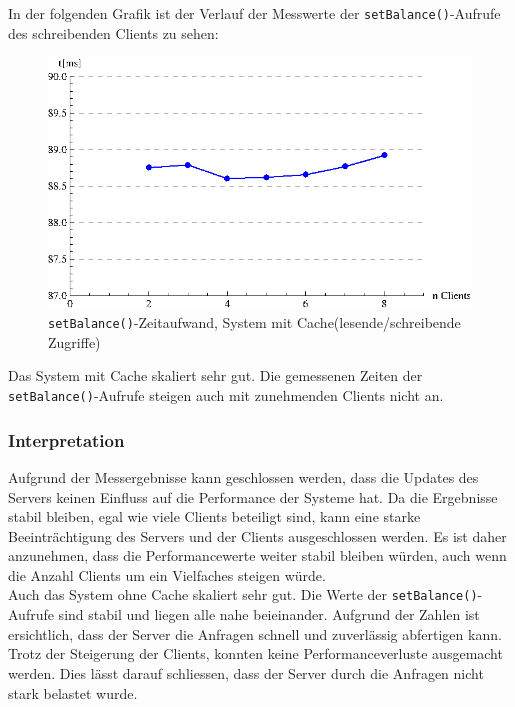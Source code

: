 In der folgenden Grafik ist der Verlauf der Messwerte der \texttt{setBalance()}-Aufrufe des schreibenden Clients zu sehen:
\begin{figure}[H]
\begin{center}
\includegraphics[width=\textwidth]{images_MessErgebnisse/incrementAndReadCache.eps}
\end{center}
\caption{\texttt{setBalance()}-Zeitaufwand, System mit Cache(lesende/schreibende Zugriffe)}
\end{figure}

Das System mit Cache skaliert sehr gut. Die gemessenen Zeiten der \texttt{setBalance()}-Aufrufe steigen auch mit zunehmenden Clients nicht an.

\subsubsection{Interpretation}

Aufgrund der Messergebnisse kann geschlossen werden, dass die Updates des Servers keinen Einfluss auf die Performance der Systeme hat. Da die Ergebnisse stabil bleiben, egal wie viele Clients beteiligt sind, kann eine starke Beeinträchtigung des Servers und der Clients ausgeschlossen werden. Es ist daher anzunehmen, dass die Performancewerte weiter stabil bleiben würden, auch wenn die Anzahl Clients um ein Vielfaches steigen würde.\\

Auch das System ohne Cache skaliert sehr gut. Die Werte der \texttt{setBalance()}-Aufrufe sind stabil und liegen alle nahe beieinander. Aufgrund der Zahlen ist ersichtlich, dass der Server die Anfragen schnell und zuverlässig abfertigen kann. Trotz der Steigerung der Clients, konnten keine Performanceverluste ausgemacht werden. Dies lässt darauf schliessen, dass der Server durch die Anfragen nicht stark belastet wurde.\\

